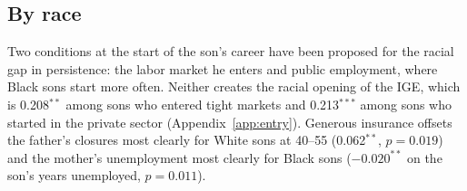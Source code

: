 

\subsection{By race}

Two conditions at the start of the son's career have been proposed for the racial gap in persistence: the labor
market he enters and public employment, where Black sons start more often. Neither creates the racial opening of the
IGE, which is 0.208$^{**}$ among sons who entered tight markets and 0.213$^{***}$ among sons who started in the private
sector (Appendix~\ref{app:entry}). Generous insurance offsets the father's closures most clearly for White sons at
40--55 (0.062$^{**}$, $p = 0.019$) and the mother's unemployment most clearly for Black sons ($-0.020^{**}$ on the son's
years unemployed, $p = 0.011$).
